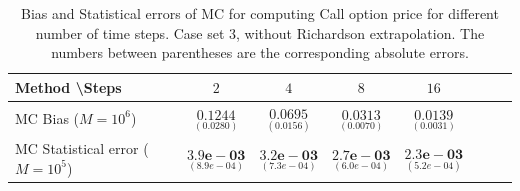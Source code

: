 \documentclass[11pt]{article}
\begin{document}
\begin{table}[h!]
	\centering
	\begin{tabular}{l*{6}{c}r}
		Method \textbackslash  Steps            & $2$ & $4$ & $8$ & $16$  \\
		\hline
		MC Bias ($M=10^6$)   & 	$ \underset{(  0.0280)}{\mathbf{0.1244}}$  & $\underset{(  0.0156
			)}{\mathbf{0.0695}}$  & $\underset{(0.0070
			)}{\mathbf{0.0313}}$ & $\underset{( 0.0031
			)}{\mathbf{0.0139}}$\\ 
		
		MC Statistical error ($M=10^5$)  &  $\underset{(8.9e-04)} {\mathbf{3.9e-03}}$  & $\underset{( 7.3e-04)} {\mathbf{3.2e-03}}$  & $\underset{(  6.0e-04)} {\mathbf{ 2.7e-03}}$ & $\underset{(5.2e-04)} {\mathbf{2.3e-03}}$	\\
		\hline
	\end{tabular}
	\caption{Bias and Statistical errors of MC  for computing Call option price  for different number of time steps. Case set 3, without Richardson extrapolation. The numbers between parentheses are the corresponding absolute errors.}
	\label{Bias and Statistical errors of MC ($M=10^6$)  for computing Call option price  for different number of time steps. Case set 3, without Richardson extrapolation. The numbers between parentheses are the corresponding absolute errors.}
\end{table}
\end{document}
